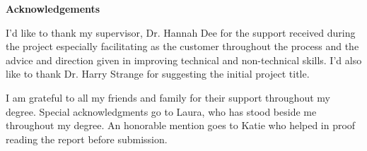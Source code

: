 \thispagestyle{empty}

\begin{center}
    {\LARGE\bf Acknowledgements}
\end{center}

I'd like to thank my supervisor, Dr. Hannah Dee for the support received during the project especially facilitating as the customer throughout the process and the advice and direction given in improving technical and non-technical skills. I'd also like to thank Dr. Harry Strange for suggesting the initial project title.

I am grateful to all my friends and family for their support throughout my degree. Special acknowledgments go to Laura, who has stood beside me throughout my degree. An honorable mention goes to Katie who helped in proof reading the report before submission.
